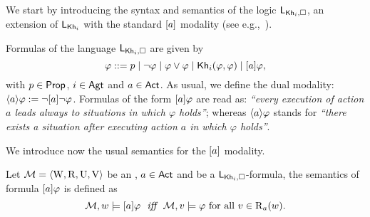 We start by introducing the syntax and semantics of the logic $\mathsf{L}_{{\sf Kh}_i,\square}$,  an extension of $\mathsf{L}_{{\sf Kh}_i}$ with the standard $[a]$ modality (see e.g.,~\cite{HML,mlbook}).

\medskip

\begin{definition}\label{def:khimlsyntax}
Formulas of the language $\mathsf{L}_{{\sf Kh}_i,\square}$ are given by
\[
\varphi ::= p \mid \neg\varphi \mid \varphi\vee\varphi \mid {\sf Kh}_i(\varphi,\varphi) \mid [a]\varphi,
\]
with $p \in {\rm \sf Prop}$, $i \in {\rm \sf Agt}$ and $a \in {\rm \sf Act}$.
As usual, we define the dual modality: $\langle a \rangle\varphi := \neg[a]\neg\varphi$. Formulas of the form $[a]\varphi$ are read as: \emph{``every execution of action $a$ leads always to situations in which $\varphi$ holds''};
whereas  $\langle a \rangle\varphi$ stands for 
\emph{``there exists a situation after executing action $a$ in which $\varphi$ holds''}.
\end{definition}

\medskip

We introduce now the usual semantics for the $[a]$ modality.

\medskip

\begin{definition}\label{def:khimlsemantics}
Let $\mathcal{M} = \langle \operatorname{W}, \operatorname{R}, \operatorname{U}, \operatorname{V} \rangle$ be an \ults, $a \in {\rm \sf Act}$ and  be a $\mathsf{L}_{{\sf Kh}_i,\square}$-formula, the semantics of formula $[a]\varphi$ is defined as
\[
\modults,w \models \mlbox{a}\varphi \ \ \iff \ \ \modults,v \models \varphi \mbox{ for all }v \in \R_a(w).
\]
\end{definition}

